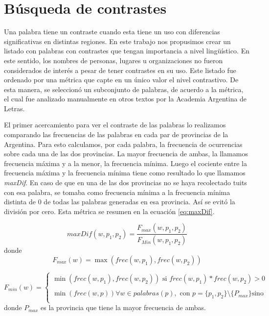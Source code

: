 \section{Búsqueda de contrastes}

Una palabra tiene un contraste cuando esta tiene un uso con diferencias significativas en
distintas regiones. En este trabajo nos propusimos crear un listado con palabras con contrastes que tengan
importancia a nivel lingüístico. En este sentido, los nombres de personas, lugares u organizaciones no 
fueron considerados de interés a pesar de tener contrastes en su uso.
Este listado fue ordenado por una métrica que capte en un único valor el nivel contrastivo. De esta manera, 
se seleccionó un subconjunto de palabras, de acuerdo a la métrica, el cual fue analizado manualmente en otros textos por la Academia Argentina de Letras.

El primer acercamiento para ver el contraste de las palabras lo realizamos comparando las frecuencias de las palabras 
en cada par de provincias de la Argentina. Para esto calculamos, por cada palabra, la frecuencia de ocurrencias sobre cada una de las dos provincias. La mayor frecuencia de ambas, la llamamos frecuencia máxima y a la menor, la frecuencia mínima. Luego el cociente entre la frecuencia máxima y la frecuencia mínima tiene como resultado lo que llamamos \textit{maxDif}. En caso de que en una de las dos provincias no se haya 
recolectado tuits con esa palabra, se tomaba como frecuencia mínima a la frecuencia mínima distinta de 0 de todas las palabras generadas en esa provincia. Así se evitó la división por cero. Esta métrica se resumen en la ecuación \ref{eq:maxDif}.


\begin{equation}
  \label{eq:maxDif} 
  maxDif(w,p_1,p_2) = \frac{F_{max}(w,p_1,p_2)}{F_{Min}(w,p_1,p_2)}
\end{equation}
donde 
\begin{equation}
F_{max}(w) = \max(frec(w,p_1),frec(w,p_2))
\end{equation}

\begin{equation}
 F_{min}(w) = \left\{ \begin{array}{ll}
             \min(frec(w,p_1),frec(w,p_2))  \text{ si } frec(w,p_1) * frec(w,p_2) > 0  & \\
             \\
             \min(frec(w,p))  \forall w \in palabras(p) , \text{ con } p=\{p_1,p_2\} \setminus \{P_{max}\} \text{sino} &  \\
             \end{array}
   \right.
\end{equation}
   donde $P_{max}$ es la provincia que tiene la mayor frecuencia de ambas.




